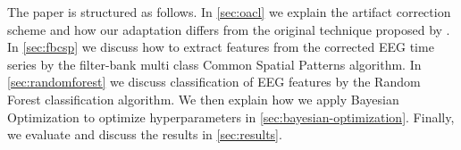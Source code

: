 The paper is structured as follows. In \cref{sec:oacl} we explain the artifact correction scheme and how our adaptation differs from the original technique proposed by \citet{li2015ocular}. In \cref{sec:fbcsp} we discuss how to extract features from the corrected EEG time series by the filter-bank multi class Common Spatial Patterns algorithm. In \cref{sec:randomforest} we discuss classification of EEG features by the Random Forest classification algorithm. We then explain how we apply Bayesian Optimization to optimize hyperparameters in \cref{sec:bayesian-optimization}. Finally, we evaluate and discuss the results in \cref{sec:results}.
